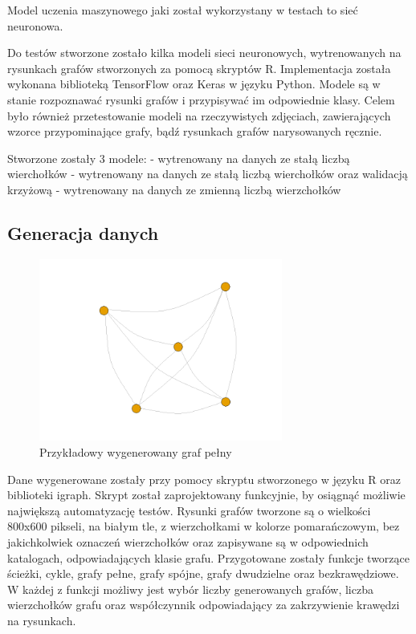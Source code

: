 Model uczenia maszynowego jaki został wykorzystany w testach to sieć neuronowa.

Do testów stworzone zostało kilka modeli sieci neuronowych,
wytrenowanych na rysunkach grafów stworzonych za pomocą skryptów R.
Implementacja została wykonana biblioteką TensorFlow oraz Keras w języku Python.
Modele są w stanie rozpoznawać rysunki grafów i przypisywać im odpowiednie klasy.
Celem było również przetestowanie modeli na rzeczywistych zdjęciach,
zawierających wzorce przypominające grafy, bądź rysunkach grafów narysowanych ręcznie.

Stworzone zostały 3 modele:
- wytrenowany na danych ze stałą liczbą wierchołków
- wytrenowany na danych ze stałą liczbą wierchołków oraz walidacją krzyżową
- wytrenowany na danych ze zmienną liczbą wierzchołków

\subsection{Generacja danych}

\begin{figure}[ht]
	\centering
	\includegraphics[height=6cm]{partials/images/graph_full.png}
	\caption{Przykładowy wygenerowany graf pełny}
	\label{Fig:tests-generation-1}
\end{figure}
\FloatBarrier

Dane wygenerowane zostały przy pomocy skryptu stworzonego w języku R oraz biblioteki igraph.
Skrypt został zaprojektowany funkcyjnie, by osiągnąć możliwie największą automatyzację testów.
Rysunki grafów tworzone są o wielkości 800x600 pikseli, na białym tle, z wierzchołkami w kolorze pomarańczowym,
bez jakichkolwiek oznaczeń wierzchołków oraz zapisywane są w odpowiednich katalogach, odpowiadających klasie grafu.
Przygotowane zostały funkcje tworzące ścieżki, cykle, grafy pełne, grafy spójne, grafy dwudzielne oraz bezkrawędziowe.
W każdej z funkcji możliwy jest wybór liczby generowanych grafów, liczba wierzchołków grafu
oraz współczynnik odpowiadający za zakrzywienie krawędzi na rysunkach.

